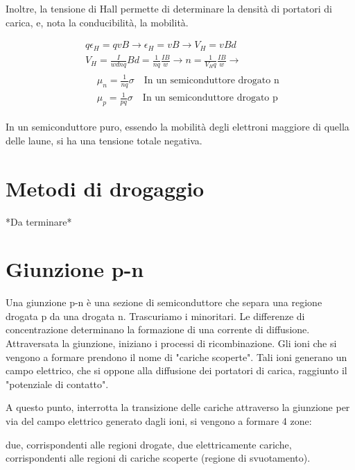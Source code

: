 \documentclass{article}
\begin{document}
Inoltre, la tensione di Hall permette di determinare la densità di portatori di carica, e, nota la conducibilità, la mobilità.

\begin{equation}
    \begin{aligned}
         & q\epsilon_H=qvB \rightarrow \epsilon_H=vB \rightarrow V_H=vBd                                      \\
         & V_H=\frac{I}{wdnq}Bd=\frac{1}{nq}\frac{IB}{w} \rightarrow n=\frac{1}{V_Hq}\frac{IB}{w} \rightarrow \\
         & \begin{aligned}
                & \mu_n=\frac{1}{nq}\sigma \quad \text{In un semiconduttore drogato n} \\
                & \mu_p=\frac{1}{pq}\sigma \quad \text{In un semiconduttore drogato p}
           \end{aligned}
    \end{aligned}
\end{equation}

In un semiconduttore puro, essendo la mobilità degli elettroni  maggiore di quella delle laune, si ha una tensione totale negativa.

\section{Metodi di drogaggio}
*Da terminare*

\section{Giunzione p-n}
Una giunzione p-n è una sezione di semiconduttore che separa una regione drogata p da una drogata n.
Trascuriamo i minoritari. Le differenze di concentrazione determinano la formazione di una corrente di diffusione.
Attraversata la giunzione, iniziano i processi di ricombinazione. Gli ioni che si vengono a formare prendono il nome di "cariche scoperte".
Tali ioni generano un campo elettrico, che si oppone alla diffusione dei portatori di carica, raggiunto il "potenziale di contatto".

A questo punto, interrotta la transizione delle cariche attraverso la giunzione per via del campo elettrico generato dagli ioni, si vengono a formare 4 zone:

due, corrispondenti alle regioni drogate, due elettricamente cariche, corrispondenti alle regioni di cariche scoperte (regione di svuotamento).
\end{document}
